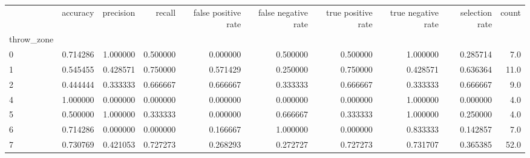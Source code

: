 \begin{tabular}{lrrrrrrrrr}
\toprule
{} &  accuracy &  precision &    recall &  false positive rate &  false negative rate &  true positive rate &  true negative rate &  selection rate &  count \\
throw\_zone &           &            &           &                      &                      &                     &                     &                 &        \\
\midrule
0          &  0.714286 &   1.000000 &  0.500000 &             0.000000 &             0.500000 &            0.500000 &            1.000000 &        0.285714 &    7.0 \\
1          &  0.545455 &   0.428571 &  0.750000 &             0.571429 &             0.250000 &            0.750000 &            0.428571 &        0.636364 &   11.0 \\
2          &  0.444444 &   0.333333 &  0.666667 &             0.666667 &             0.333333 &            0.666667 &            0.333333 &        0.666667 &    9.0 \\
4          &  1.000000 &   0.000000 &  0.000000 &             0.000000 &             0.000000 &            0.000000 &            1.000000 &        0.000000 &    4.0 \\
5          &  0.500000 &   1.000000 &  0.333333 &             0.000000 &             0.666667 &            0.333333 &            1.000000 &        0.250000 &    4.0 \\
6          &  0.714286 &   0.000000 &  0.000000 &             0.166667 &             1.000000 &            0.000000 &            0.833333 &        0.142857 &    7.0 \\
7          &  0.730769 &   0.421053 &  0.727273 &             0.268293 &             0.272727 &            0.727273 &            0.731707 &        0.365385 &   52.0 \\
\bottomrule
\end{tabular}
